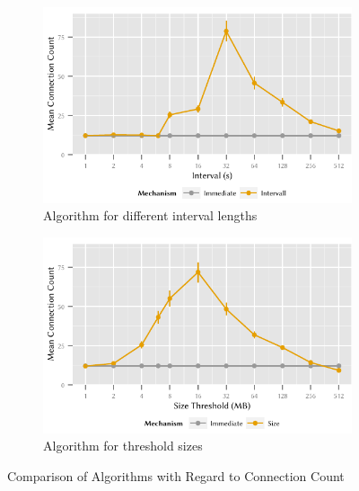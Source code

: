 \begin{figure}
	\begin{subfigure}[b]{\textwidth}
	\centering
	\includegraphics{application/cloud_file_synchronization/numerical_evaluation/figures/interval_connection}
	\caption{Algorithm \algointerval for different interval lengths}\label{fig:application:cloud_file_synchronisation:numerical_evaluation:connection:connection:interval}
	\end{subfigure} 
	\begin{subfigure}[b]{\textwidth}
	\centering
	\includegraphics{application/cloud_file_synchronization/numerical_evaluation/figures/size_connection}
	\caption{Algorithm \algosize for threshold sizes}\label{fig:application:cloud_file_synchronisation:numerical_evaluation:connection:connection:size}
	\end{subfigure}

	\caption{Comparison of Algorithms with Regard to Connection Count \connectionCount}\label{fig:application:cloud_file_synchronisation:numerical_evaluation:connection:connection}
\end{figure}

